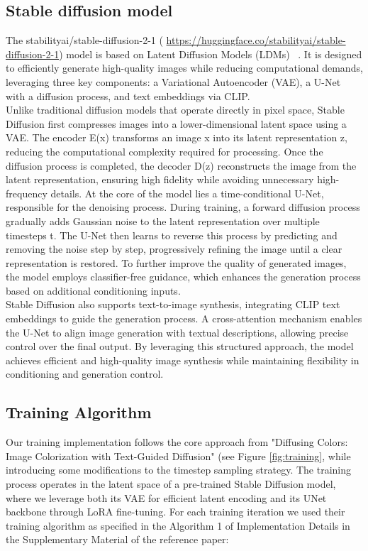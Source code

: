 \documentclass[10pt,twocolumn,letterpaper]{article}
\begin{document}
\subsection{Stable diffusion model}
The stabilityai/stable-diffusion-2-1 ( \href{https://huggingface.co/stabilityai/stable-diffusion-2-1} {https://huggingface.co/stabilityai/stable-diffusion-2-1}) model is based on Latent Diffusion Models (LDMs)  ~\cite{Rombach}. It is designed to efficiently generate high-quality images while reducing computational demands, leveraging three key components: a Variational Autoencoder (VAE), a U-Net with a diffusion process, and text embeddings via CLIP.
\\
\indent
Unlike traditional diffusion models that operate directly in pixel space, Stable Diffusion first compresses images into a lower-dimensional latent space using a VAE. The encoder E(x) transforms an image x into its latent representation z, reducing the computational complexity required for processing. Once the diffusion process is completed, the decoder D(z) reconstructs the image from the latent representation, ensuring high fidelity while avoiding unnecessary high-frequency details.
At the core of the model lies a time-conditional U-Net, responsible for the denoising process. During training, a forward diffusion process gradually adds Gaussian noise to the latent representation over multiple timesteps t. The U-Net then learns to reverse this process by predicting and removing the noise step by step, progressively refining the image until a clear representation is restored. To further improve the quality of generated images, the model employs classifier-free guidance, which enhances the generation process based on additional conditioning inputs.
\\
\indent
Stable Diffusion also supports text-to-image synthesis, integrating CLIP text embeddings to guide the generation process. A cross-attention mechanism enables the U-Net to align image generation with textual descriptions, allowing precise control over the final output. By leveraging this structured approach, the model achieves efficient and high-quality image synthesis while maintaining flexibility in conditioning and generation control.


\subsection{Training Algorithm}

Our training implementation follows the core approach from "Diffusing Colors: Image Colorization with Text-Guided Diffusion" (see Figure \ref{fig:training}, while introducing some modifications to the timestep sampling strategy. The training process operates in the latent space of a pre-trained Stable Diffusion model, where we leverage both its VAE for efficient latent encoding and its UNet backbone through LoRA fine-tuning.
For each training iteration we used their training algorithm as specified in the Algorithm 1 of Implementation Details in the Supplementary Material of the reference paper:
\end{document}
